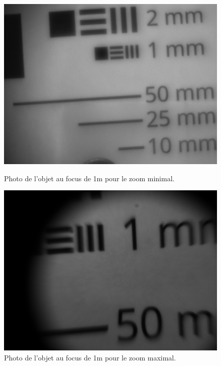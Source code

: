 \documentclass[11pt,letterpaper]{article}
\begin{document}
\begin{figure}[H]
    \centering
    \begin{minipage}[t]{0.47\linewidth}
        \centering
        \includegraphics[scale=0.21]{res_1m_min.png}
        \caption{Photo de l'objet au focus de 1m pour le zoom minimal.}
        \label{res_min}
    \end{minipage}\hfill
    \begin{minipage}[t]{0.5\linewidth}
        \centering
        \includegraphics[scale=0.21]{res_1m_max.png}
        \caption{Photo de l'objet au focus de 1m pour le zoom maximal.}
        \label{res_max}
    \end{minipage}
\end{figure}
\end{document}
